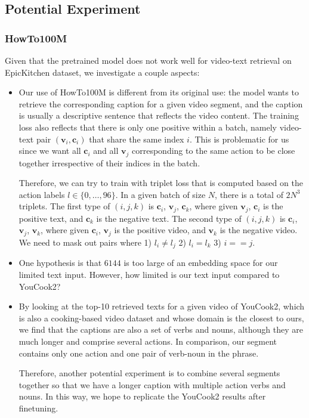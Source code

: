 \subsection{Potential Experiment}

\subsubsection{HowTo100M}

Given that the pretrained model does not work well for video-text retrieval on EpicKitchen dataset, we investigate a couple aspects:
\begin{itemize}
    \item Our use of HowTo100M is different from its original use: the model wants to retrieve the corresponding caption for a given video segment, and the caption is usually a descriptive sentence that reflects the video content. The training loss also reflects that there is only one positive within a batch, namely video-text pair $(\mathbf{v}_i, \mathbf{c}_i)$ that share the same index $i$. This is problematic for us since we want all $\mathbf{c}_i$ and all $\mathbf{v}_j$ corresponding to the same action to be close together irrespective of their indices in the batch. 
    
    Therefore, we can try to train with triplet loss that is computed based on the action labels $l \in \{0,\dots,96\}$. In a given batch of size $N$, there is a total of $2N^3$ triplets. 
    The first type of $(i,j,k)$ is $\mathbf{c}_i$, $\mathbf{v}_j$, $\mathbf{c}_k$, where given $\mathbf{v}_j$, $\mathbf{c}_i$ is the positive text, and $\mathbf{c}_k$ is the negative text.
    The second type of $(i,j,k)$ is $\mathbf{c}_i$, $\mathbf{v}_j$, $\mathbf{v}_k$, where given $\mathbf{c}_i$, $\mathbf{v}_j$ is the positive video, and $\mathbf{v}_k$ is the negative video. 
    We need to mask out pairs where 1) $l_i \neq l_j$ 2) $l_i = l_k$ 3) $i == j$.   
    
    \item One hypothesis is that $6144$ is too large of an embedding space for our limited text input. However, how limited is our text input compared to YouCook2? 
    
    \item By looking at the top-10 retrieved texts for a given video of YouCook2, which is also a cooking-based video dataset and whose domain is the closest to ours, we find that the captions are also a set of verbs and nouns, although they are much longer and comprise several actions. In comparison, our segment contains only one action and one pair of verb-noun in the phrase. 
    
    Therefore, another potential experiment is to combine several segments together so that we have a longer caption with multiple action verbs and nouns. In this way, we hope to replicate the YouCook2 results after finetuning.  
\end{itemize}